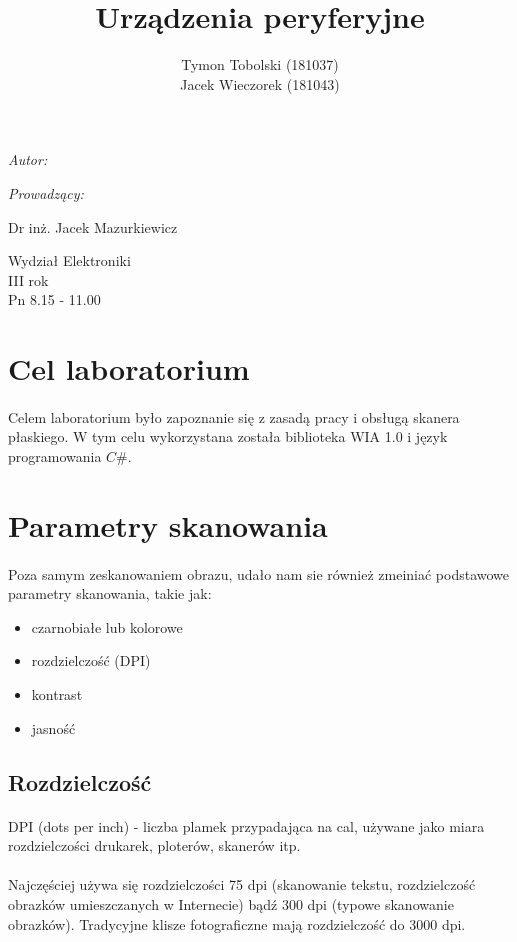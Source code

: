 \documentclass[wide,a4paper,titlepage,12pt] {article}
\title{Urządzenia peryferyjne}
\author{Tymon Tobolski (181037)\\ Jacek Wieczorek (181043)}
\makeatletter
\renewcommand{\maketitle}{
\begin{titlepage}
  \begin{center}
    \vspace*{3cm}
    \LARGE \@title \par
    \vspace{2cm}
    \textit{\small Autor:}\par
    \normalsize \@author\par \normalsize
    \vspace{3cm}
    \textit{\small Prowadzący:}\par
    Dr inż. Jacek Mazurkiewicz \par
    \vspace{2cm}
    Wydział Elektroniki\\ III rok\\ Pn 8.15 - 11.00\par
    \vspace{4cm}
    \small \@date
  \end{center}
\end{titlepage}
}
\makeatother
\begin{document}
\maketitle

\section{Cel laboratorium}
\paragraph{}
Celem laboratorium było zapoznanie się z zasadą pracy i obsługą skanera płaskiego. W tym celu wykorzystana została biblioteka WIA 1.0 i język programowania $C\#$.

\section{Parametry skanowania}
\paragraph{} %
Poza samym zeskanowaniem obrazu, udało nam sie również zmeiniać podstawowe parametry skanowania, takie jak:
\begin{itemize}
    \item czarnobiałe lub kolorowe
    \item rozdzielczość (DPI)
    \item kontrast
    \item jasność
\end{itemize}

\subsection{Rozdzielczość}
\paragraph{}
DPI (dots per inch) - liczba plamek przypadająca na cal, używane jako miara rozdzielczości drukarek, ploterów, skanerów itp. 
\paragraph{} %
\label{par:}
Najczęściej używa się rozdzielczości 75 dpi (skanowanie tekstu, rozdzielczość obrazków umieszczanych w Internecie) bądź 300 dpi (typowe skanowanie obrazków). Tradycyjne klisze fotograficzne mają rozdzielczość do 3000 dpi.
\end{document}
